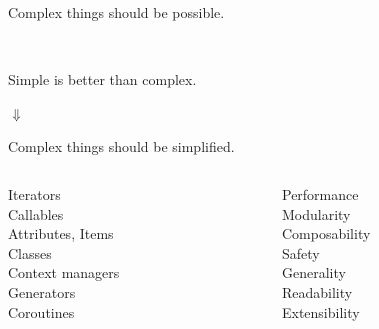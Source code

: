 \documentclass[20pt]{beamer}
\begin{document}
\begin{center}
\begin{frame}[fragile]
    Complex things should be possible.

    \pause
    ~

    Simple is better than complex.

    \pause
    $\Downarrow$

    Complex things should be simplified.

\end{frame}
% 
% 
% 
% 
% 
%     
% 
% 
% 
% 
% 
% 
% 

\begin{frame}[fragile]

    \small
    \bigskip
\begin{columns}
\begin{column}{0.5\textwidth}
\begin{centering}
Iterators\\
Callables\\
Attributes, Items\\
Classes\\
Context managers\\
Generators\\
Coroutines\\
\end{centering}
\end{column}
\begin{column}{0.5\textwidth}
\begin{centering}
Performance\\
Modularity\\
Composability\\
Safety\\
Generality\\
Readability\\
Extensibility\\
\end{centering}
\end{column}
\end{columns}
\end{frame}


\end{center}
\end{document}
